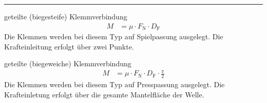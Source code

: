 \hrule
\begin{eeqn}{geteilte (biegesteife) Klemmverbindung}
	\begin{align}
		M &= \mu \cdot F_\text{N} \cdot D_\text{F}
	\end{align}
	Die Klemmen werden bei diesem Typ auf Spielpassung ausgelegt. Die Krafteinleitung erfolgt über zwei Punkte.
\end{eeqn}

\begin{eeqn}{geteilte (biegeweiche) Klemmverbindung}
	\begin{align}
		M &= \mu \cdot F_\text{N} \cdot D_\text{F} \cdot \frac{\pi}{2}
	\end{align}
	Die Klemmen werden bei diesem Typ auf Presspassung ausgelegt. Die Krafteinletung erfolgt über die gesamte Mantelfläche der Welle.
\end{eeqn}

